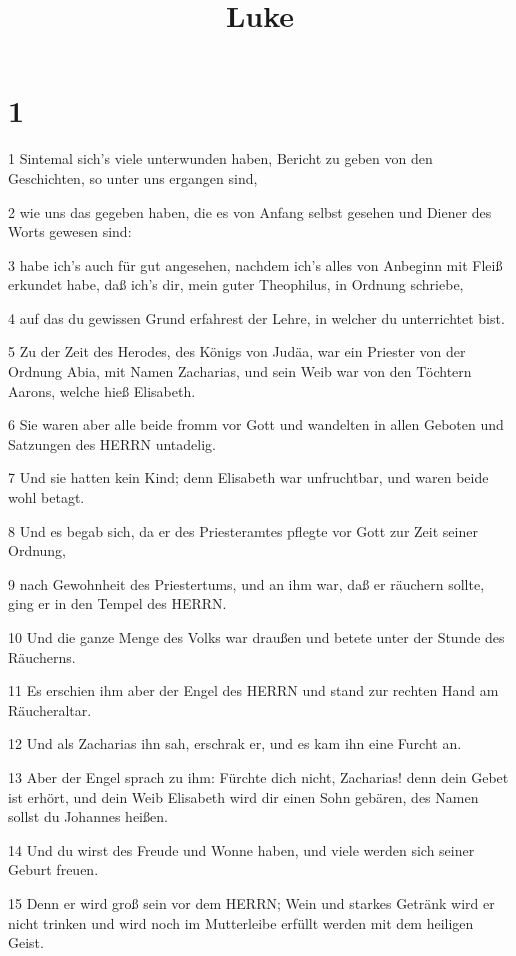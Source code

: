

\title{Luke}


\chapter{1}

\par 1 Sintemal sich's viele unterwunden haben, Bericht zu geben von den Geschichten, so unter uns ergangen sind,
\par 2 wie uns das gegeben haben, die es von Anfang selbst gesehen und Diener des Worts gewesen sind:
\par 3 habe ich's auch für gut angesehen, nachdem ich's alles von Anbeginn mit Fleiß erkundet habe, daß ich's dir, mein guter Theophilus, in Ordnung schriebe,
\par 4 auf das du gewissen Grund erfahrest der Lehre, in welcher du unterrichtet bist.
\par 5 Zu der Zeit des Herodes, des Königs von Judäa, war ein Priester von der Ordnung Abia, mit Namen Zacharias, und sein Weib war von den Töchtern Aarons, welche hieß Elisabeth.
\par 6 Sie waren aber alle beide fromm vor Gott und wandelten in allen Geboten und Satzungen des HERRN untadelig.
\par 7 Und sie hatten kein Kind; denn Elisabeth war unfruchtbar, und waren beide wohl betagt.
\par 8 Und es begab sich, da er des Priesteramtes pflegte vor Gott zur Zeit seiner Ordnung,
\par 9 nach Gewohnheit des Priestertums, und an ihm war, daß er räuchern sollte, ging er in den Tempel des HERRN.
\par 10 Und die ganze Menge des Volks war draußen und betete unter der Stunde des Räucherns.
\par 11 Es erschien ihm aber der Engel des HERRN und stand zur rechten Hand am Räucheraltar.
\par 12 Und als Zacharias ihn sah, erschrak er, und es kam ihn eine Furcht an.
\par 13 Aber der Engel sprach zu ihm: Fürchte dich nicht, Zacharias! denn dein Gebet ist erhört, und dein Weib Elisabeth wird dir einen Sohn gebären, des Namen sollst du Johannes heißen.
\par 14 Und du wirst des Freude und Wonne haben, und viele werden sich seiner Geburt freuen.
\par 15 Denn er wird groß sein vor dem HERRN; Wein und starkes Getränk wird er nicht trinken und wird noch im Mutterleibe erfüllt werden mit dem heiligen Geist.
